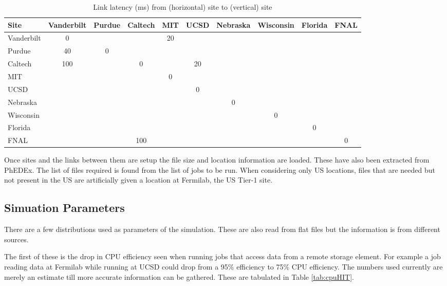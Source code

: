 \documentclass[a4paper]{jpconf}
\begin{document}
\begin{table}
  \begin{center}
    \begin{tabular}{|l|ccccccccc|}
      \hline
      Site & Vanderbilt & Purdue & Caltech & MIT & UCSD & Nebraska &
      Wisconsin & Florida & FNAL \\
      \hline
      Vanderbilt & 0 & & & 20 & & & & & \\
      Purdue & 40 & 0 & & & & & & & \\
      Caltech & 100 & & 0 & & 20 & & & & \\
      MIT & & & & 0 & & & & & \\
      UCSD & & & & & 0 & & & & \\
      Nebraska & & & & & & 0 & & & \\
      Wisconsin & & & & & & & 0 & & \\
      Florida & & & & & & & & 0 & \\
      FNAL & & & 100 & & & & & & 0 \\
      \hline
    \end{tabular}
    \caption{Link latency (ms) from (horizontal) site to (vertical) site\label{tab:latency}}
  \end{center}
\end{table}

Once sites and the links between them are setup the file size and
location information are loaded. These have also been extracted from
PhEDEx. The list of files required is found from the list of jobs to
be run. When considering only US locations, files that are needed but
not present in the US are artificially given a location at Fermilab,
the US Tier-1 site.

\subsection{Simuation Parameters}

There are a few distributions used as parameters of the
simulation. These are also read from flat files but the information is
from different sources.

The first of these is the drop in CPU efficiency seen when running
jobs that access data from a remote storage element. For example a job
reading data at Fermilab while running at UCSD could drop from a 95\%
efficiency to 75\% CPU efficiency. The numbers used currently are
merely an estimate till more accurate information can be
gathered. These are tabulated in Table \ref{tab:cpuHIT}.
\end{document}
